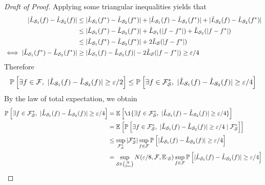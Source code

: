\begin{proof}[Draft of Proof]
	Applying some triangular inequalities yields that
	\begin{align*}
		|\hat{L}_{\mathcal{S}_1}(f) - \hat{L}_{\mathcal{S}_2}(f)| &\leq |\hat{L}_{\mathcal{S}_1}(f^*) - \hat{L}_{\mathcal{S}_2}(f^*)| + |\hat{L}_{\mathcal{S}_1}(f) - \hat{L}_{\mathcal{S}_1}(f^*)| + |\hat{L}_{\mathcal{S}_2}(f) - \hat{L}_{\mathcal{S}_2}(f^*)|  \\
		&\leq |\hat{L}_{\mathcal{S}_1}(f^*) - \hat{L}_{\mathcal{S}_2}(f^*)| + \hat{L}_{\mathcal{S}_1}(|f - f^*|) + \hat{L}_{\mathcal{S}_2}(|f - f^*|) \\
		&\leq |\hat{L}_{\mathcal{S}_1}(f^*) - \hat{L}_{\mathcal{S}_2}(f^*)| + 2  \hat{L}_{\mathcal{S}}(|f - f^*|)\\
		\iff |\hat{L}_{\mathcal{S}_1}(f^*) - \hat{L}_{\mathcal{S}_2}(f^*)| &\geq |\hat{L}_{\mathcal{S}_1}(f) - \hat{L}_{\mathcal{S}_2}(f)| - 2  \hat{L}_{\mathcal{S}}(|f - f^*|) \geq \varepsilon/4 
	\end{align*}
	Therefore
	\begin{equation}
		\PPP{}{\exists f \in \mathcal{F},\ |\estloss{\mathcal{S}_1}(\query) - \estloss{\mathcal{S}_2}(\query)| \geq \epsilon/2} \leq \PPP{}{\exists f \in \mathcal{F^*_\mathcal{S}},\ |\estloss{\mathcal{S}_1}(\query) - \estloss{\mathcal{S}_2}(\query)| \geq \epsilon/4}
	\end{equation}
	By the law of total expectation, we obtain
	\begin{align*}
		\PPP{}{\exists f \in \mathcal{F^*_\mathcal{S}},\ |\estloss{\mathcal{S}_1}(\query) - \estloss{\mathcal{S}_2}(\query)| \geq \epsilon/4}
		&=\EEE{}{ \1 \{\exists f \in \mathcal{F^*_\mathcal{S}},\ |\estloss{\mathcal{S}_1}(\query) - \estloss{\mathcal{S}_2}(\query)| \geq \epsilon/4 \} }\\
		&=\EEE{}{ \PPP{}{\exists f \in \mathcal{F^*_\mathcal{S}},\ |\estloss{\mathcal{S}_1}(\query) - \estloss{\mathcal{S}_2}(\query)| \geq \epsilon/4 \mid \mathcal{F^*_\mathcal{S}}}  }\\
        &\leq \sup_{\mathcal{F^*_\mathcal{S}}} |\mathcal{F^*_\mathcal{S}}| \sup_{f \in \mathcal{F}} \PPP{}{\lvert \estloss{\mathcal{S}_1}(\query) - \estloss{\mathcal{S}_2}(\query) \rvert \geq \epsilon/4 }\\
		&= \sup_{\mathcal{S} \in \binom{\mathcal{X}}{2m} } N(\epsilon/8, \mathcal{F}, \EE \cdot_{\mathcal{S}}) \sup_{f \in \mathcal{F}} \PPP{}{\lvert \estloss{\mathcal{S}_1}(\query) - \estloss{\mathcal{S}_2}(\query) \rvert \geq \epsilon/4 }
	\end{align*}

\end{proof}